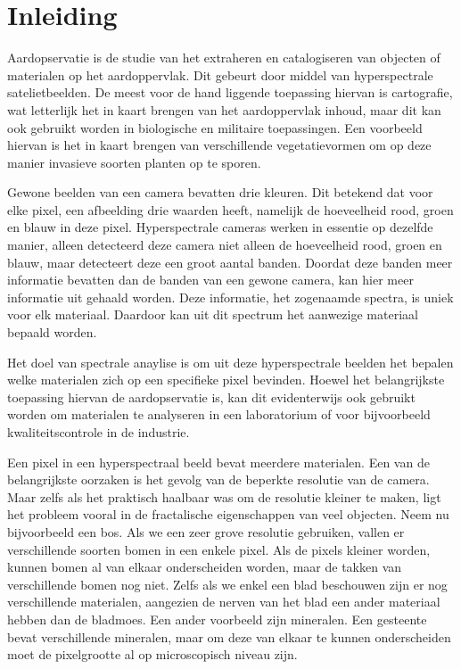 \documentclass[12pt]{report}
\begin{document}
\newpage
\chapter*{Inleiding}


Aardopservatie is de studie van het extraheren en catalogiseren van objecten of materialen op het aardoppervlak. Dit gebeurt door middel van hyperspectrale satelietbeelden. De meest voor de hand liggende toepassing hiervan is cartografie, wat letterlijk het in kaart brengen van het aardoppervlak inhoud, maar dit kan ook gebruikt worden in biologische en militaire toepassingen. Een voorbeeld hiervan is het in kaart brengen van verschillende vegetatievormen\cite{dias12} om op deze manier invasieve soorten planten op te sporen. 

Gewone beelden van een camera bevatten drie kleuren. Dit betekend dat voor elke pixel, een afbeelding drie waarden heeft, namelijk de hoeveelheid rood, groen en blauw in deze pixel. Hyperspectrale cameras werken in essentie op dezelfde manier, alleen detecteerd deze camera niet alleen de hoeveelheid rood, groen en blauw, maar detecteert deze een groot aantal banden. Doordat deze banden meer informatie bevatten dan de banden van een gewone camera, kan hier  meer informatie uit gehaald worden. Deze informatie, het zogenaamde spectra, is uniek voor elk materiaal. Daardoor kan uit dit spectrum het aanwezige materiaal bepaald worden.

Het doel van spectrale anaylise is om uit deze hyperspectrale beelden het bepalen welke materialen zich op een specifieke pixel bevinden. Hoewel het belangrijkste toepassing hiervan de aardopservatie is, kan dit evidenterwijs ook gebruikt worden om materialen te analyseren in een laboratorium of voor bijvoorbeeld kwaliteitscontrole in de industrie.


Een pixel in een hyperspectraal beeld bevat meerdere materialen. Een van de belangrijkste oorzaken is het gevolg van de beperkte resolutie van de camera. Maar zelfs als het praktisch haalbaar was om de resolutie kleiner te maken, ligt het probleem vooral in de fractalische eigenschappen van veel objecten. Neem nu bijvoorbeeld een bos. Als we een zeer grove resolutie gebruiken, vallen er verschillende soorten bomen in een enkele pixel. Als de pixels kleiner worden, kunnen bomen al van elkaar onderscheiden worden, maar de takken van verschillende bomen nog niet. Zelfs als we enkel een blad beschouwen zijn er nog verschillende materialen, aangezien de nerven van het blad een ander materiaal hebben dan de bladmoes. Een ander voorbeeld zijn mineralen. Een gesteente bevat verschillende mineralen, maar om deze van elkaar te kunnen onderscheiden moet de pixelgrootte al op microscopisch niveau zijn. 
\end{document}
